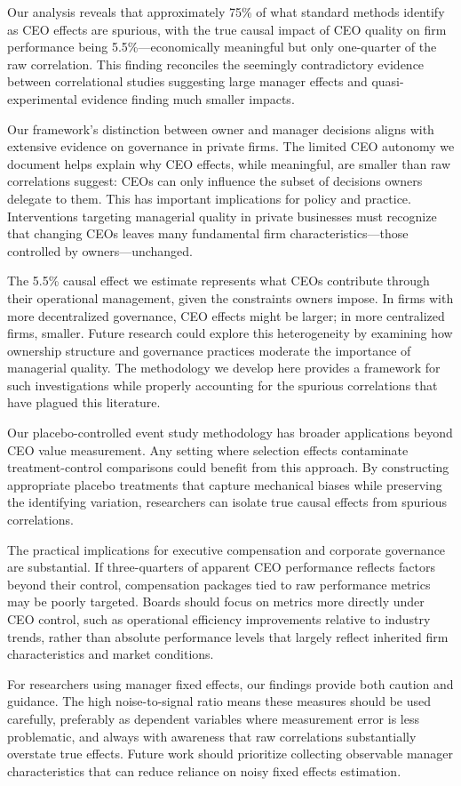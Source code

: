 \documentclass[11pt,a4paper]{article}
\begin{document}
Our analysis reveals that approximately 75\% of what standard methods identify as CEO effects are spurious, with the true causal impact of CEO quality on firm performance being 5.5\%---economically meaningful but only one-quarter of the raw correlation. This finding reconciles the seemingly contradictory evidence between correlational studies suggesting large manager effects and quasi-experimental evidence finding much smaller impacts.

Our framework's distinction between owner and manager decisions aligns with extensive evidence on governance in private firms. The limited CEO autonomy we document helps explain why CEO effects, while meaningful, are smaller than raw correlations suggest: CEOs can only influence the subset of decisions owners delegate to them. This has important implications for policy and practice. Interventions targeting managerial quality in private businesses must recognize that changing CEOs leaves many fundamental firm characteristics---those controlled by owners---unchanged.

The 5.5\% causal effect we estimate represents what CEOs contribute through their operational management, given the constraints owners impose. In firms with more decentralized governance, CEO effects might be larger; in more centralized firms, smaller. Future research could explore this heterogeneity by examining how ownership structure and governance practices moderate the importance of managerial quality. The methodology we develop here provides a framework for such investigations while properly accounting for the spurious correlations that have plagued this literature.

Our placebo-controlled event study methodology has broader applications beyond CEO value measurement. Any setting where selection effects contaminate treatment-control comparisons could benefit from this approach. By constructing appropriate placebo treatments that capture mechanical biases while preserving the identifying variation, researchers can isolate true causal effects from spurious correlations.

The practical implications for executive compensation and corporate governance are substantial. If three-quarters of apparent CEO performance reflects factors beyond their control, compensation packages tied to raw performance metrics may be poorly targeted. Boards should focus on metrics more directly under CEO control, such as operational efficiency improvements relative to industry trends, rather than absolute performance levels that largely reflect inherited firm characteristics and market conditions.

For researchers using manager fixed effects, our findings provide both caution and guidance. The high noise-to-signal ratio means these measures should be used carefully, preferably as dependent variables where measurement error is less problematic, and always with awareness that raw correlations substantially overstate true effects. Future work should prioritize collecting observable manager characteristics that can reduce reliance on noisy fixed effects estimation.
\end{document}
